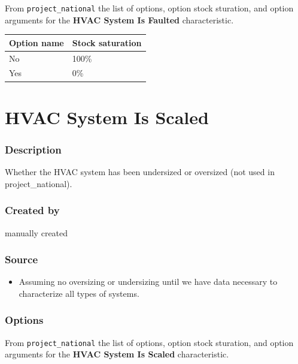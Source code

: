 From \texttt{project\_national} the list of options, option stock
sturation, and option arguments for the \textbf{HVAC System Is Faulted}
characteristic.

\begin{longtable}[]{@{}ll@{}}
\toprule\noalign{}
Option name & Stock saturation \\
\midrule\noalign{}
\endhead
\bottomrule\noalign{}
\endlastfoot
No & 100\% \\
Yes & 0\% \\
\end{longtable}

\section{HVAC System Is Scaled}\label{hvac_system_is_scaled}

\subsubsection{Description}\label{description-80}

Whether the HVAC system has been undersized or oversized (not used in
project\_national).

\subsubsection{Created by}\label{created-by-80}

manually created

\subsubsection{Source}\label{source-79}

\begin{itemize}
 
\item
  Assuming no oversizing or undersizing until we have data necessary to
  characterize all types of systems.
\end{itemize}

\subsubsection{Options}\label{options-80}

From \texttt{project\_national} the list of options, option stock
sturation, and option arguments for the \textbf{HVAC System Is Scaled}
characteristic.

